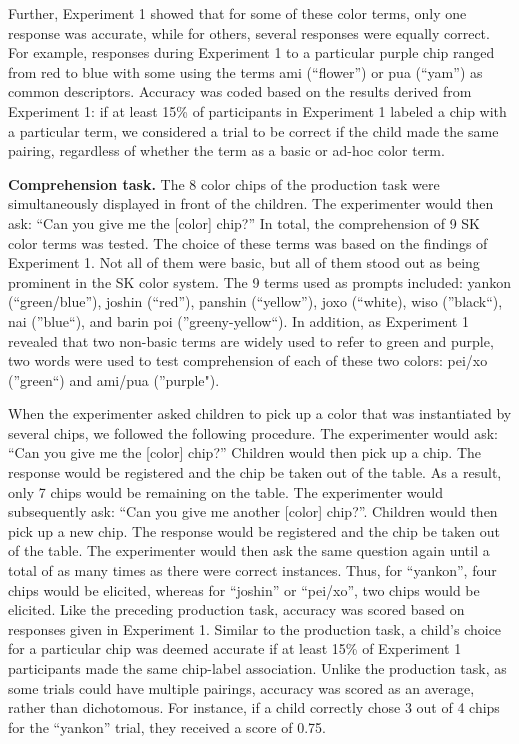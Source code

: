 \documentclass[
  english,
  ,man,floatsintext]{apa6}
\begin{document}
Further, Experiment 1 showed that for some of these color terms, only one response was accurate, while for others, several responses were equally correct. For example, responses during Experiment 1 to a particular purple chip ranged from red to blue with some using the terms ami (\enquote{flower}) or pua (\enquote{yam}) as common descriptors. Accuracy was coded based on the results derived from Experiment 1: if at least 15\% of participants in Experiment 1 labeled a chip with a particular term, we considered a trial to be correct if the child made the same pairing, regardless of whether the term as a basic or ad-hoc color term.

\textbf{Comprehension task.} The 8 color chips of the production task were simultaneously displayed in front of the children. The experimenter would then ask: \enquote{Can you give me the {[}color{]} chip?} In total, the comprehension of 9 SK color terms was tested. The choice of these terms was based on the findings of Experiment 1. Not all of them were basic, but all of them stood out as being prominent in the SK color system. The 9 terms used as prompts included: yankon (\enquote{green/blue}), joshin (\enquote{red}), panshin (\enquote{yellow}), joxo (\enquote{white), wiso (}black\enquote{), nai (}blue\enquote{), and barin poi (}greeny-yellow\enquote{). In addition, as Experiment 1 revealed that two non-basic terms are widely used to refer to green and purple, two words were used to test comprehension of each of these two colors: pei/xo (}green\enquote{) and ami/pua (}purple").

When the experimenter asked children to pick up a color that was instantiated by several chips, we followed the following procedure. The experimenter would ask: \enquote{Can you give me the {[}color{]} chip?} Children would then pick up a chip. The response would be registered and the chip be taken out of the table. As a result, only 7 chips would be remaining on the table. The experimenter would subsequently ask: \enquote{Can you give me another {[}color{]} chip?}. Children would then pick up a new chip. The response would be registered and the chip be taken out of the table. The experimenter would then ask the same question again until a total of as many times as there were correct instances. Thus, for \enquote{yankon}, four chips would be elicited, whereas for \enquote{joshin} or \enquote{pei/xo}, two chips would be elicited. Like the preceding production task, accuracy was scored based on responses given in Experiment 1. Similar to the production task, a child's choice for a particular chip was deemed accurate if at least 15\% of Experiment 1 participants made the same chip-label association. Unlike the production task, as some trials could have multiple pairings, accuracy was scored as an average, rather than dichotomous. For instance, if a child correctly chose 3 out of 4 chips for the \enquote{yankon} trial, they received a score of 0.75.
\end{document}

